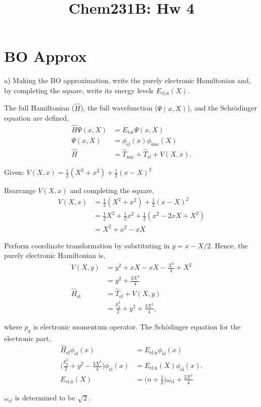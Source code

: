 \documentclass{article}
\title{Chem231B: Hw 4} %
\begin{document}
\maketitle

\section*{\textbf{BO Approx}}

a) Making the BO approximation, write the purely electronic Hamiltonian and, by
completing the square, write its energy levels $E_{\text{el,n}}(X)$.

{\color{blue}
The full Hamiltonian ($\hat{H}$), the full wavefunction ($\Psi(x,X)$),
and the Schr\"odinger equation are defined,
\begin{align}
  \hat{H}\Psi(x,X) & = E_{\text{tot}}\Psi(x,X) \\
  \Psi(x,X) & = \phi_{\text{el}}(x)\phi_{\text{nuc}}(X) \\
  \hat{H} & = \hat{T}_{\text{nuc}} + \hat{T}_{\text{el}} + V(X,x).
\end{align}

Given: $V(X,x) = \frac{1}{2}(X^2+x^2) + \frac{1}{2}(x-X)^2$

Rearrange $V(X,x)$ and completing the square,
\begin{align}
  V(X,x) & = \frac{1}{2}(X^2+x^2) + \frac{1}{2}(x-X)^2 \nonumber \\
  & = \frac{1}{2}X^2+\frac{1}{2}x^2 + \frac{1}{2}(x^2-2xX+X^2) \nonumber \\
  & = X^2 + x^2 - xX
\end{align}

Perform coordinate transformation by substituting in $y=x-X/2$.
Hence, the purely electronic Hamiltonian is,
\begin{align}
  V(X,y) & = y^2 + xX - xX - \frac{X^2}{4} + X^2 \nonumber\\
  & = y^2 + \frac{3X^2}{4} \\
  \hat{H}_{\text{el}} & = \hat{T}_{\text{el}} + V(X,y) \nonumber\\
  & = \frac{p_y^2}{2} + y^2 +\frac{3X^2}{4}, \label{eqn:omega}
\end{align}

where $p_y$ is electronic momentum operator. The Sch\"odinger equation
for the electronic part,
\begin{align}
  \hat{H}_{\text{el}}\phi_{\text{el}}(x) & = E_{\text{el,n}}\phi_{\text{el}}(x) \\
  \Big(\frac{p_y^2}{2} + y^2 -\frac{3X^2}{4}\Big)\phi_{\text{el}}(x)
  & =E_{\text{el,n}}(X)\phi_{\text{el}}(x). \label{eqn:elec} \\
  E_{\text{el,n}}(X) & = \Big(n + \frac{1}{2}\Big)\omega_{\text{el}}
  + \frac{3X^2}{4}
\end{align}

$\omega_{el}$ is determined to be $\sqrt{2}$.}
\\
\end{document}
